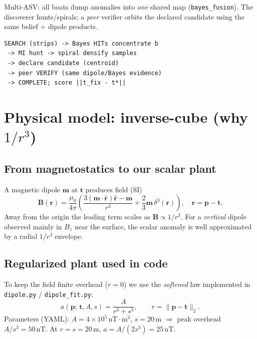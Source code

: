 \documentclass[11pt,a4paper]{article}
\begin{document}
Multi-ASV: all boats dump anomalies into \emph{one} shared map
(\texttt{bayes\_fusion}). The discoverer hunts/spirals; a \emph{peer} verifier
orbits the declared candidate using the same belief + dipole products.

\begin{lstlisting}
SEARCH (strips) -> Bayes HITs concentrate b
 -> MI hunt -> spiral densify samples
 -> declare candidate (centroid)
 -> peer VERIFY (same dipole/Bayes evidence)
 -> COMPLETE; score ||t_fix - t*||
\end{lstlisting}

\section{Physical model: inverse-cube (why \(1/r^{3}\))}

\subsection{From magnetostatics to our scalar plant}
A magnetic dipole \(\mathbf{m}\) at \(\mathbf{t}\) produces field (SI)
\[
\mathbf{B}(\mathbf{r})
=\frac{\mu_0}{4\pi}
\left(
\frac{3(\mathbf{m}\cdot\hat{\mathbf{r}})\hat{\mathbf{r}}-\mathbf{m}}{r^{3}}
+\frac{2}{3}\mathbf{m}\,\delta^{3}(\mathbf{r})
\right),
\quad \mathbf{r}=\mathbf{p}-\mathbf{t}.
\]
Away from the origin the leading term scales as \(\mathbf{B}\propto 1/r^{3}\).
For a \emph{vertical} dipole observed mainly in \(B_z\) near the surface, the
scalar anomaly is well approximated by a radial \(1/r^{3}\) envelope.

\subsection{Regularized plant used in code}
To keep the field finite overhead (\(r=0\)) we use the \emph{softened} law
implemented in \texttt{dipole.py} / \texttt{dipole\_fit.py}:
\begin{equation}
\label{eq:dipole}
a(\mathbf{p};\,\mathbf{t},A,s)
=\frac{A}{r^{3}+s^{3}},
\qquad r=\lVert\mathbf{p}-\mathbf{t}\rVert_{2}.
\end{equation}
Parameters (YAML): \(A=4\times10^{5}\,\mathrm{nT\cdot m^{3}}\),
\(s=20\,\mathrm{m}\) \(\Rightarrow\) peak overhead \(A/s^{3}=50\,\mathrm{nT}\).
At \(r=s=20\,\mathrm{m}\), \(a=A/(2s^{3})=25\,\mathrm{nT}\).
\end{document}
